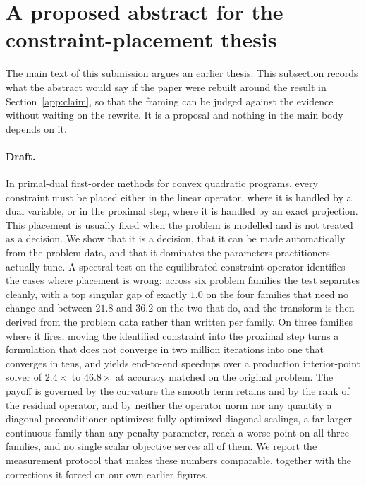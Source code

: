 \documentclass[11pt]{article}
\begin{document}
\section{A proposed abstract for the constraint-placement thesis}
\label{app:abstract}

The main text of this submission argues an earlier thesis. This subsection
records what the abstract would say if the paper were rebuilt around the
result in Section~\ref{app:claim}, so that the framing can be judged against
the evidence without waiting on the rewrite. It is a proposal and nothing in
the main body depends on it.

\paragraph{Draft.}
In primal-dual first-order methods for convex quadratic programs, every
constraint must be placed either in the linear operator, where it is handled
by a dual variable, or in the proximal step, where it is handled by an exact
projection. This placement is usually fixed when the problem is modelled and
is not treated as a decision. We show that it is a decision, that it can be
made automatically from the problem data, and that it dominates the
parameters practitioners actually tune. A spectral test on the equilibrated
constraint operator identifies the cases where placement is wrong: across six
problem families the test separates cleanly, with a top singular gap of
exactly $1.0$ on the four families that need no change and between $21.8$ and
$36.2$ on the two that do, and the transform is then derived from the problem
data rather than written per family. On three families where it fires, moving
the identified constraint into the proximal step turns a formulation that
does not converge in two million iterations into one that converges in tens,
and yields end-to-end speedups over a production interior-point solver of
$2.4\times$ to $46.8\times$ at accuracy matched on the original problem. The
payoff is governed by the curvature the smooth term retains and by the rank
of the residual operator, and by neither the operator norm nor any quantity a
diagonal preconditioner optimizes: fully optimized diagonal scalings, a far
larger continuous family than any penalty parameter, reach a worse point on
all three families, and no single scalar objective serves all of them. We
report the measurement protocol that makes these numbers comparable, together
with the corrections it forced on our own earlier figures.
\end{document}
